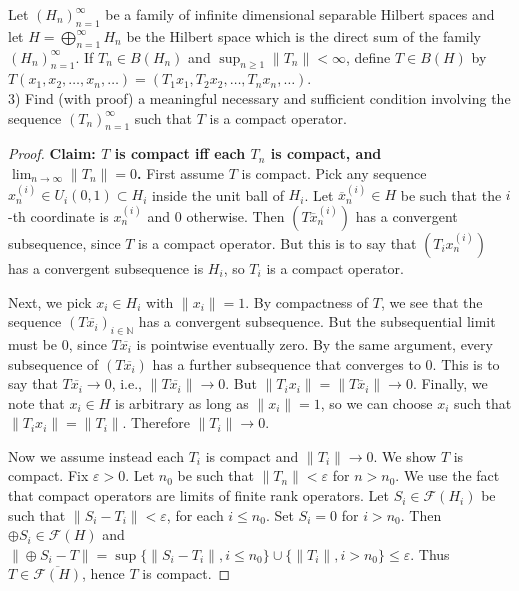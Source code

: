 \begin{problem}
	Let $\left(H_n\right)_{n=1}^{\infty}$ be a family of infinite dimensional separable Hilbert spaces and let $H=\bigoplus_{n=1}^{\infty} H_n$ be the Hilbert space which is the direct sum of the family $\left(H_n\right)_{n=1}^{\infty}$. If $T_n \in B\left(H_n\right)$ and $\sup _{n \geq 1}\left\|T_n\right\|<\infty$, define $T \in B(H)$ by $T\left(x_1, x_2, \ldots, x_n, \ldots\right)=\left(T_1 x_1, T_2 x_2, \ldots, T_n x_n, \ldots\right)$.\\
3) Find (with proof) a meaningful necessary and sufficient condition involving the sequence $\left(T_n\right)_{n=1}^{\infty}$ such that $T$ is a compact operator.
\end{problem}
\begin{proof}
	\textbf{Claim: $T$ is compact iff each $T_n$ is compact, and $\lim_{n \to \infty }\|T_n\| =  0$.} 
	First assume $T$ is compact. Pick any sequence $x^{(i)}_n \in U_i(0,1) \subset H_i$ inside the unit ball of $H_i$. Let $\overline{x} ^{(i)}_n \in H$ be such that the  $i$-th coordinate is $x^{(i)}_n$ and $0$ otherwise. Then $(T\overline{x} ^{(i)}_n)$ has a convergent subsequence, since $T$ is a compact operator. But this is to say that $(T_i x^{(i)}_n)$ has a convergent subsequence is $H_i$, so $T_i$ is a compact operator.

	Next, we pick $x_i \in H_i$ with $\|x_i\| = 1$. By compactness of $T$, we see that the sequence $\left( T \overline{x_i}  \right)_{i \in \mathbb{N}}$ has a convergent subsequence. But the subsequential limit must be $0$, since $T \overline{x_i} $ is pointwise eventually zero. By the same argument, every subsequence of $(T \overline{x_i} )$ has a further subsequence that converges to $0$. This is to say that $T \overline{x_i}  \to 0$, i.e., $\|T \overline{x_i} \| \to 0$. But $\|T_i x_i\| = \|T \overline{x} _i\| \to 0$. Finally, we note that $x_i \in H$ is arbitrary as long as $\|x_i\| = 1$, so we can choose $x_i$ such that $\|T_i x_i\| = \|T_i\|$. Therefore $\|T_i\| \to 0$.

	Now we assume instead each  $T_i$ is compact and $\|T_i\| \to 0$. We show $T$ is compact. Fix $\varepsilon>0$. Let $n_0$ be such that $\|T_n\| < \varepsilon$ for $n > n_{0}$. We use the fact that compact operators are limits of finite rank operators. Let $S_i \in \mathcal{F}(H_i)$ be such  that  $\|S_i - T_i\| < \varepsilon$, for each $i \le n_0$. Set $S_i = 0$ for $i > n_0$. Then  $\oplus S_i \in \mathcal{F}(H)$ and $\|\oplus S_i - T\| = \sup \{\|S_i - T_i\|, i \le n_0\}\cup \{\|T_i\|, i > n_0\}  \le  \varepsilon$. Thus  $T \in \overline{\mathcal{F}(H)} $, hence $T$ is compact.
\end{proof}

